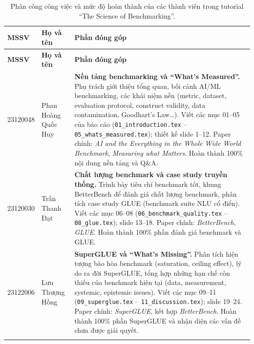 
\small
\setlength{\tabcolsep}{6pt}
\renewcommand{\arraystretch}{1.2}

\begin{longtable}{p{2.2cm} p{3.6cm} p{10.2cm}}
\caption{Phân công công việc và mức độ hoàn thành của các thành viên trong tutorial “The Science of Benchmarking”.}
\label{tab:work_distribution_benchmarking} \\

\toprule
\textbf{MSSV} & \textbf{Họ và tên} & \textbf{Phần đóng góp} \\
\midrule
\endfirsthead

\toprule
\textbf{MSSV} & \textbf{Họ và tên} & \textbf{Phần đóng góp} \\
\midrule
\endhead

23120048 & Phan Hoàng Quốc Huy &
\textbf{Nền tảng benchmarking và “What’s Measured”.}
Phụ trách giới thiệu tổng quan, bối cảnh AI/ML benchmarking, các khái niệm nền (metric, dataset, evaluation protocol, construct validity, data contamination, Goodhart’s Law…).
Viết các mục 01--05 của báo cáo (\texttt{01\_introduction.tex} -- \texttt{05\_whats\_measured.tex}); thiết kế slide 1--12.
Paper chính: \emph{AI and the Everything in the Whole Wide World Benchmark}, \emph{Measuring what Matters}.
Hoàn thành 100\% nội dung nền tảng và Q\&A. \\
\addlinespace

23120030 & Trần Thanh Đạt &
\textbf{Chất lượng benchmark và case study truyền thống.}
Trình bày tiêu chí benchmark tốt, khung BetterBench để đánh giá chất lượng benchmark, phân tích case study GLUE (benchmark suite NLU cổ điển).
Viết các mục 06--08 (\texttt{06\_benchmark\_quality.tex} -- \texttt{08\_glue.tex}); slide 13--18.
Paper chính: \emph{BetterBench}, \emph{GLUE}.
Hoàn thành 100\% phần đánh giá benchmark và GLUE. \\
\addlinespace

23122006 & Lưu Thượng Hồng &
\textbf{SuperGLUE và “What’s Missing”.}
Phân tích hiện tượng bão hòa benchmark (saturation, ceiling effect), lý do ra đời SuperGLUE, tổng hợp những hạn chế còn thiếu của benchmark hiện tại (data, measurement, systemic, epistemic issues).
Viết các mục 09--11 (\texttt{09\_superglue.tex} -- \texttt{11\_discussion.tex}); slide 19--24.
Paper chính: \emph{SuperGLUE}, kết hợp \emph{BetterBench}.
Hoàn thành 100\% phần SuperGLUE và nhận diện các vấn đề chưa được giải quyết. \\
\addlinespace


\end{longtable}
